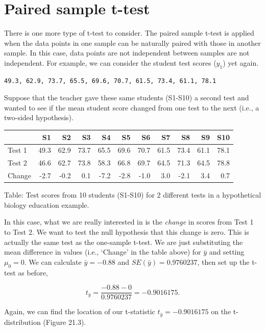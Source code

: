\documentclass[
]{scrbook}
\begin{document}
\hypertarget{paired-sample-t-test}{%
\section{Paired sample t-test}\label{paired-sample-t-test}}

There is one more type of t-test to consider.
The paired sample t-test is applied when the data points in one sample can be naturally paired with those in another sample.
In this case, data points are not independent between samples are not independent.
For example, we can consider the student test scores (\(y_{1}\)) yet again.

\begin{verbatim}
49.3, 62.9, 73.7, 65.5, 69.6, 70.7, 61.5, 73.4, 61.1, 78.1
\end{verbatim}

Suppose that the teacher gave these same students (S1-S10) a second test and wanted to see if the mean student score changed from one test to the next (i.e., a two-sided hypothesis).

\begin{tabular}{l|r|r|r|r|r|r|r|r|r|r}
\hline
  & S1 & S2 & S3 & S4 & S5 & S6 & S7 & S8 & S9 & S10\\
\hline
Test 1 & 49.3 & 62.9 & 73.7 & 65.5 & 69.6 & 70.7 & 61.5 & 73.4 & 61.1 & 78.1\\
\hline
Test 2 & 46.6 & 62.7 & 73.8 & 58.3 & 66.8 & 69.7 & 64.5 & 71.3 & 64.5 & 78.8\\
\hline
Change & -2.7 & -0.2 & 0.1 & -7.2 & -2.8 & -1.0 & 3.0 & -2.1 & 3.4 & 0.7\\
\hline
\end{tabular}

Table: Test scores from 10 students (S1-S10) for 2 different tests in a hypothetical biology education example.

In this case, what we are really interested in is the \emph{change} in scores from Test 1 to Test 2.
We want to test the null hypothesis that this change is zero.
This is actually the same test as the one-sample t-test.
We are just substituting the mean difference in values (i.e., `Change' in the table above) for \(\bar{y}\) and setting \(\mu_{0} = 0\).
We can calculate \(\bar{y} = -0.88\) and \(SE(\bar{y})=0.9760237\), then set up the t-test as before,

\[t_{\bar{y}} = \frac{-0.88 - 0}{0.9760237} = -0.9016175.\]

Again, we can find the location of our t-statistic \(t_{\bar{y}} = -0.9016175\) on the t-distribution (Figure 21.3).
\end{document}
